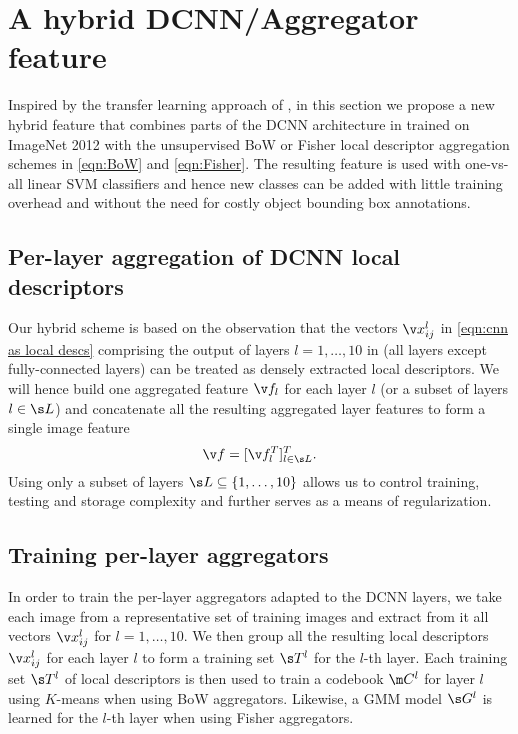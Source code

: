 \documentclass{article}
\begin{document}

\section{A hybrid DCNN/Aggregator feature}\label{proposed}
Inspired by the transfer learning approach of \cite{Oquaba}, in this section we propose a new hybrid feature that combines parts of the DCNN architecture in  trained on ImageNet 2012 with the unsupervised BoW or Fisher local descriptor aggregation schemes in \eqref{eqn:BoW} and \eqref{eqn:Fisher}. The resulting feature is used with one-vs-all linear SVM classifiers and hence new classes can be added with little training overhead and without the need for costly object bounding box annotations.

\subsection{Per-layer aggregation of DCNN local descriptors}
\label{hybrid}
Our hybrid scheme is based on the observation that the vectors $\v x^l_{ij}$ in \eqref{eqn:cnn as local descs} comprising the output of layers $l=1,\ldots,10$ in  (\ie all layers except fully-connected layers) can be treated as densely extracted local descriptors. We will hence build one aggregated feature $\v f_l$ for each layer $l$ (or a subset of layers $l \in \s L$) and concatenate all the resulting aggregated layer features to form a single image feature 
\begin{equation} \label{eqn:hybrid}
\v f = [\v f_l^T]_{l\in \s L}^T.
\end{equation}
Using only a subset of layers $\s L \subseteq \{1,\ldots,10\}$ allows us to control training, testing and storage complexity and further serves as a means of regularization.


\subsection{Training per-layer aggregators}
In order to train the per-layer aggregators adapted to the DCNN layers, we take each image from a representative set of training images and extract from it all vectors $\v x^l_{ij}$ for $l=1,\ldots,10$. We then group all the resulting local descriptors $\v x^l_{ij}$ for each layer $l$ to form a training set $\s T^l$ for the $l$-th layer. Each training set $\s T^l$ of local descriptors is then used to train a codebook $\m C^l$ for layer $l$ using $K$-means when using BoW aggregators. Likewise, a GMM model $\s G^l$ is learned for the $l$-th layer when using Fisher aggregators.
\end{document}

